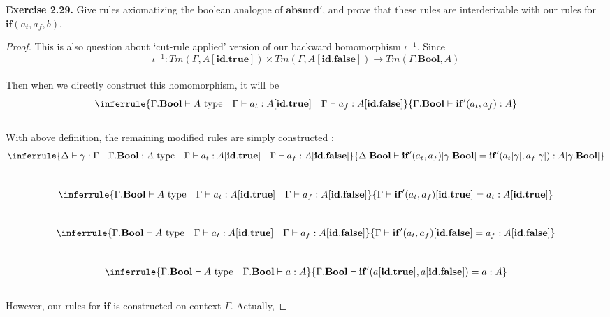 \documentclass[12pt, a4paper, openany, twoside]{book}
\theoremstyle{definition}
\theoremstyle{remark}
\theoremstyle{plain}
\numberwithin{equation}{section}
\begin{document}
\begin{tcolorbox}[breakable, colback=yellow!10!white,colframe=brown!75!black,title=Exercise 3.3.5.]\hypertarget{const 3.3.5.}{}

\textbf{Exercise 2.29.} Give rules axiomatizing the boolean analogue of $\mathbf{absurd}'$, and prove 
that these rules are interderivable with our rules for $\mathbf{if}(a_t, a_f, b)$. 

\begin{proof}
    
This is also question about \lq cut-rule applied' version of our backward homomorphism $\iota^{-1}$. 
Since 
\[\iota^{-1} : Tm(\Gamma, A[\mathbf{id}.\mathbf{true}]) \times Tm(\Gamma, A[\mathbf{id}.\mathbf{false}]) \rightarrow Tm(\Gamma.\mathbf{Bool}, A) \]
\\
Then when we directly construct this homomorphism, it will be 
\[
\inferrule
{
    \Gamma.\mathbf{Bool} \vdash A \text{ type} \quad \Gamma \vdash a_t : A[\mathbf{id}.\mathbf{true}] \quad \Gamma \vdash a_f : A[\mathbf{id}.\mathbf{false}]
}
{
    \Gamma.\mathbf{Bool} \vdash \mathbf{if}'(a_t, a_f) : A 
}
\]
\\
With above definition, the remaining modified rules are simply constructed : 
\[
\inferrule
{
    \Delta \vdash \gamma : \Gamma \quad \Gamma.\mathbf{Bool} : A \text{ type} \quad \Gamma \vdash a_t : A[\mathbf{id}.\mathbf{true}] \quad \Gamma \vdash a_f : A[\mathbf{id}.\mathbf{false}]
}
{
    \Delta.\mathbf{Bool} \vdash \mathbf{if}'(a_t, a_f)[\gamma.\mathbf{Bool}] = \mathbf{if}'(a_t[\gamma], a_f[\gamma]) : A[\gamma.\mathbf{Bool}]
}
\]
\\
\[
\inferrule
{
    \Gamma.\mathbf{Bool} \vdash A \text{ type} \quad \Gamma \vdash a_t : A[\mathbf{id}.\mathbf{true}] \quad \Gamma \vdash a_f : A[\mathbf{id}.\mathbf{false}]
}
{
    \Gamma \vdash \mathbf{if}'(a_t, a_f)[\mathbf{id}.\mathbf{true}] = a_t : A[\mathbf{id}.\mathbf{true}]
}
\]
\\
\[
\inferrule
{
    \Gamma.\mathbf{Bool} \vdash A \text{ type} \quad \Gamma \vdash a_t : A[\mathbf{id}.\mathbf{true}] \quad \Gamma \vdash a_f : A[\mathbf{id}.\mathbf{false}]
}
{
    \Gamma \vdash \mathbf{if}'(a_t, a_f)[\mathbf{id}.\mathbf{false}] = a_f : A[\mathbf{id}.\mathbf{false}]
}
\]
\\
\[
\inferrule
{
    \Gamma.\mathbf{Bool} \vdash A \text{ type} \quad \Gamma.\mathbf{Bool} \vdash a : A
}
{
    \Gamma.\mathbf{Bool} \vdash \mathbf{if}'(a[\mathbf{id}.\mathbf{true}], a[\mathbf{id}.\mathbf{false}]) = a : A}
\]
\\
However, our rules for $\mathbf{if}$ is constructed on context $\Gamma$. Actually, 

\end{proof}
\end{tcolorbox}
\end{document}
